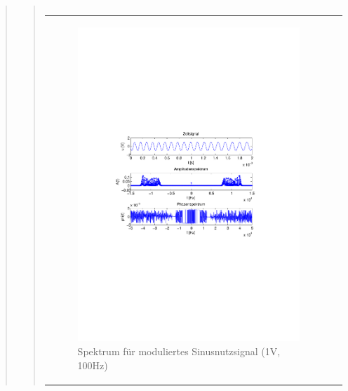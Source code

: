 \begin{quote}
\begin{quote}
\begin{center}
\begin{tabular}{ll}
            \end{tabular}
            \end{center}
        	
        	   
        	       \begin{center}
            \begin{tabular}{ll}

            \hspace{-10em}
                \begin{minipage}{0.6\textwidth}

                    \begin{figure}[H]
                        \label{fig:}
                        \includegraphics[scale=0.5, trim = 4cm 9.5cm 3.5cm
                        9.5cm, clip]{./Bilder/sin_a1_f100}
                        \caption{Spektrum für moduliertes Sinusnutzsignal (1V,
                        100Hz)}
                    \end{figure}


\end{minipage}
\end{tabular}
\end{center}
\end{quote}
\end{quote}
